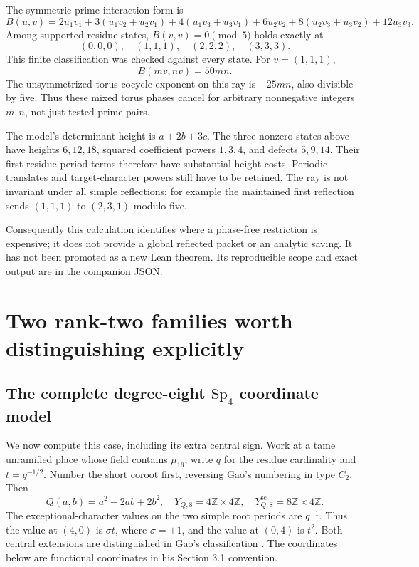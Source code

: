 \documentclass[11pt]{article}
\newcommand{\ZZ}{\mathbb Z}
\newcommand{\Sp}{\mathrm{Sp}}
\begin{document}
The symmetric prime-interaction form is
\[
 B(u,v)=2u_1v_1+3(u_1v_2+u_2v_1)
 +4(u_1v_3+u_3v_1)+6u_2v_2
 +8(u_2v_3+u_3v_2)+12u_3v_3.
\]
Among supported residue states, $B(v,v)=0\pmod5$ holds exactly at
\[
 (0,0,0),\quad(1,1,1),\quad(2,2,2),\quad(3,3,3).
\]
This finite classification was checked against every state.
For $v=(1,1,1)$,
\[
 B(mv,nv)=50mn.
\]
The unsymmetrized torus cocycle exponent on this ray is $-25mn$,
also divisible by five. Thus these mixed torus phases cancel for
arbitrary nonnegative integers $m,n$, not just tested prime pairs.

The model's determinant height is $a+2b+3c$. The three nonzero states
above have heights $6,12,18$, squared coefficient powers $1,3,4$,
and defects $5,9,14$. Their first residue-period terms therefore have
substantial height costs. Periodic translates and target-character
powers still have to be retained. The ray is not invariant under all
simple reflections: for example the maintained first reflection sends
$(1,1,1)$ to $(2,3,1)$ modulo five.

Consequently this calculation identifies where a phase-free restriction
is expensive; it does not provide a global reflected packet or an
analytic saving. It has not been promoted as a new Lean theorem.
Its reproducible scope and exact output are in the companion JSON.

\section{Two rank-two families worth distinguishing explicitly}

\subsection{The complete degree-eight $\Sp_4$ coordinate model}

We now compute this case, including its extra central sign.
Work at a tame unramified place whose field contains $\mu_{16}$;
write $q$ for the residue cardinality and $t=q^{-1/2}$.
Number the short coroot first, reversing Gao's numbering in type $C_2$.
Then
\[
 Q(a,b)=a^2-2ab+2b^2,\quad
 Y_{Q,8}=4\ZZ\times4\ZZ,\quad
 Y_{Q,8}^{\mathrm{sc}}=8\ZZ\times4\ZZ.
\]
The exceptional-character values on the two simple root periods are
$q^{-1}$. Thus the value at $(4,0)$ is $\sigma t$, where $\sigma=\pm1$,
and the value at $(0,4)$ is $t^2$.
Both central extensions are distinguished in Gao's classification
\cite[Section 5.2.4]{Gao}. The coordinates below are functional
coordinates in his Section 3.1 convention.
\end{document}

